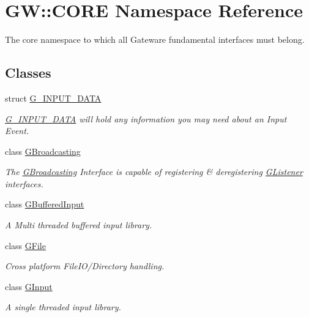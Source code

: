 \hypertarget{namespace_g_w_1_1_c_o_r_e}{}\section{GW\+:\+:C\+O\+RE Namespace Reference}
\label{namespace_g_w_1_1_c_o_r_e}


The core namespace to which all Gateware fundamental interfaces must belong.  


\subsection*{Classes}
\begin{DoxyCompactItemize}
\item 
struct \hyperlink{struct_g_w_1_1_c_o_r_e_1_1_g___i_n_p_u_t___d_a_t_a}{G\+\_\+\+I\+N\+P\+U\+T\+\_\+\+D\+A\+TA}
\begin{DoxyCompactList}\small\item\em \hyperlink{struct_g_w_1_1_c_o_r_e_1_1_g___i_n_p_u_t___d_a_t_a}{G\+\_\+\+I\+N\+P\+U\+T\+\_\+\+D\+A\+TA} will hold any information you may need about an Input Event. \end{DoxyCompactList}\item 
class \hyperlink{class_g_w_1_1_c_o_r_e_1_1_g_broadcasting}{G\+Broadcasting}
\begin{DoxyCompactList}\small\item\em The \hyperlink{class_g_w_1_1_c_o_r_e_1_1_g_broadcasting}{G\+Broadcasting} Interface is capable of registering \& deregistering \hyperlink{class_g_w_1_1_c_o_r_e_1_1_g_listener}{G\+Listener} interfaces. \end{DoxyCompactList}\item 
class \hyperlink{class_g_w_1_1_c_o_r_e_1_1_g_buffered_input}{G\+Buffered\+Input}
\begin{DoxyCompactList}\small\item\em A Multi threaded buffered input library. \end{DoxyCompactList}\item 
class \hyperlink{class_g_w_1_1_c_o_r_e_1_1_g_file}{G\+File}
\begin{DoxyCompactList}\small\item\em Cross platform File\+I\+O/\+Directory handling. \end{DoxyCompactList}\item 
class \hyperlink{class_g_w_1_1_c_o_r_e_1_1_g_input}{G\+Input}
\begin{DoxyCompactList}\small\item\em A single threaded input library. \end{DoxyCompactList}\item 

\end{DoxyCompactItemize}
